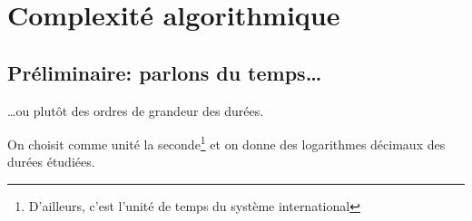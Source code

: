 %
%
%
%
%
%
%
%

\section{Complexité algorithmique }
\subsection{Préliminaire: parlons du temps\ldots{}}

\ldots{}ou plutôt des ordres de grandeur des durées.

On choisit comme unité la seconde\footnote{D'ailleurs, c'est l'unité de temps du système international} et on donne des logarithmes décimaux des durées étudiées.



